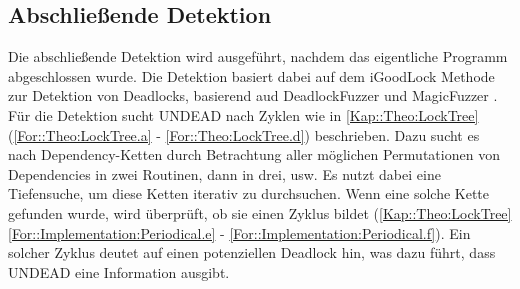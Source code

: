 \subsection{Abschließende Detektion} \label{Kap::UNDEAD:Abschließende}
Die abschließende Detektion wird ausgeführt, nachdem das eigentliche Programm
abgeschlossen wurde. Die Detektion basiert dabei auf dem iGoodLock Methode 
zur Detektion von Deadlocks, basierend aud DeadlockFuzzer \cite{Joshi} und 
MagicFuzzer \cite{Cai}. Für die Detektion sucht UNDEAD nach Zyklen wie in 
\ref{Kap::Theo:LockTree} (\eqref{For::Theo:LockTree.a} - \eqref{For::Theo:LockTree.d})
beschrieben. Dazu sucht es nach Dependency-Ketten 
durch Betrachtung aller möglichen Permutationen von Dependencies in zwei Routinen, dann 
in drei, usw. Es nutzt dabei 
eine Tiefensuche, um diese Ketten iterativ zu durchsuchen. Wenn eine solche Kette 
gefunden wurde, wird überprüft, ob sie einen Zyklus bildet (\ref{Kap::Theo:LockTree} 
\eqref{For::Implementation:Periodical.e} - \eqref{For::Implementation:Periodical.f}).
Ein solcher Zyklus deutet auf einen potenziellen Deadlock hin, was dazu 
führt, dass UNDEAD eine Information ausgibt.


